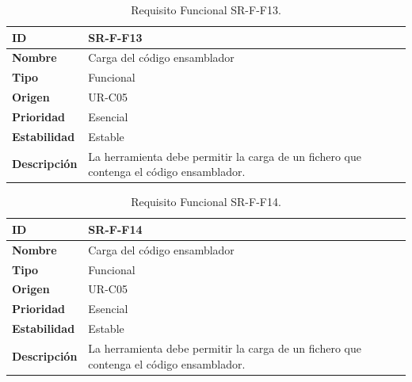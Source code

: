 \begin{center}
\begin{table}[htbp]
\centering
\begin{tabular}{@{}p{2.5cm} p{9cm}@{}} 
\toprule
\textbf{ID} 				& SR-F-F13 \\
\midrule
\textbf{Nombre} 			& Carga del código ensamblador\\
\midrule
\textbf{Tipo} 			& Funcional \\
\midrule
\textbf{Origen} 			& UR-C05 \\
\midrule
\textbf{Prioridad}		& Esencial \\
\midrule
\textbf{Estabilidad} 		& Estable \\
\midrule
\textbf{Descripción} 	& La herramienta debe permitir la carga de un fichero que contenga el código ensamblador. \\
\bottomrule
\end{tabular}
\caption{Requisito Funcional SR-F-F13.}
\label{tab:srff13}
\end{table}
\end{center}

\begin{center}
\begin{table}[htbp]
\centering
\begin{tabular}{@{}p{2.5cm} p{9cm}@{}} 
\toprule
\textbf{ID} 				& SR-F-F14 \\
\midrule
\textbf{Nombre} 			& Carga del código ensamblador\\
\midrule
\textbf{Tipo} 			& Funcional \\
\midrule
\textbf{Origen} 			& UR-C05 \\
\midrule
\textbf{Prioridad}		& Esencial \\
\midrule
\textbf{Estabilidad} 		& Estable \\
\midrule
\textbf{Descripción} 	& La herramienta debe permitir la carga de un fichero que contenga el código ensamblador. \\
\bottomrule
\end{tabular}
\caption{Requisito Funcional SR-F-F14.}
\label{tab:srff14}
\end{table}
\end{center}

